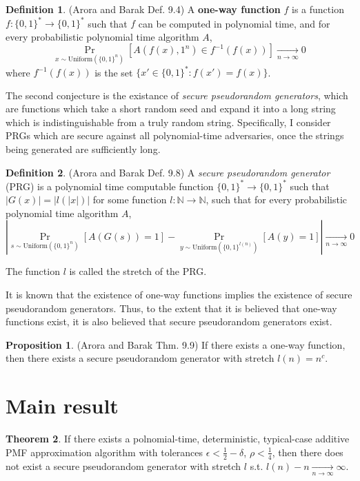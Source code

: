 \documentclass{article}
\theoremstyle{definition}
\newtheorem{defn}{Definition}
\newtheorem{thm}{Theorem}
\newtheorem{prop}[thm]{Proposition}
\theoremstyle{remark}
\begin{document}
\begin{defn}{(Arora and Barak Def. 9.4)}
A \textbf{one-way function} $f$ is a function $f : \{0, 1\}^* \to \{0, 1\}^*$ such that $f$ can be computed in polynomial time, and for every probabilistic polynomial time algorithm $A$,
$$
\Pr_{x \sim \text{Uniform}(\{0, 1\}^n)}[A(f(x), 1^n) \in f^{-1}(f(x))] \underset{n \to \infty}{\to} 0
$$
where $f^{-1}(f(x))$ is the set $\{x' \in \{0, 1\}^* : f(x') = f(x)\}$.
\end{defn}

The second conjecture is the existance of \textit{secure pseudorandom generators}, which are functions which take a short random seed and expand it into a long string which is indistinguishable from a truly random string.
Specifically, I consider PRGs which are secure against all polynomial-time adversaries, once the strings being generated are sufficiently long.

\begin{defn}{(Arora and Barak Def. 9.8)}
A \textit{secure pseudorandom generator} (PRG) is a polynomial time computable function $\{0, 1\}^* \to \{0, 1\}^*$ such that $|G(x)| = |l(|x|)|$ for some function $l : \mathbb{N} \to \mathbb{N}$, such that for every probabilistic polynomial time algorithm $A$,
$$
|\Pr_{s \sim \text{Uniform}(\{0, 1\}^n)}[A(G(s)) = 1] - \Pr_{y \sim \text{Uniform}(\{0, 1\}^{l(n)})}[A(y) = 1]| \underset{n \to \infty}{\to} 0
$$

The function $l$ is called the stretch of the PRG.
\end{defn}

It is known that the existence of one-way functions implies the existence of secure pseudorandom generators.
Thus, to the extent that it is believed that one-way functions exist, it is also believed that secure pseudorandom generators exist.
\begin{prop}{(Arora and Barak Thm. 9.9)}
If there exists a one-way function, then there exists a secure pseudorandom generator with stretch $l(n) = n^c$.
\end{prop}

\section{Main result}
\begin{thm} \label{thm:main}
If there exists a polnomial-time, deterministic, typical-case additive PMF approximation algorithm with tolerances $\epsilon < \frac{1}{2} - \delta$, $\rho < \frac{1}{4}$,
then there does not exist a secure pseudorandom generator with stretch $l$ s.t. $l(n) - n \underset{n \to \infty}{\to} \infty$.
\end{thm}
\end{document}
